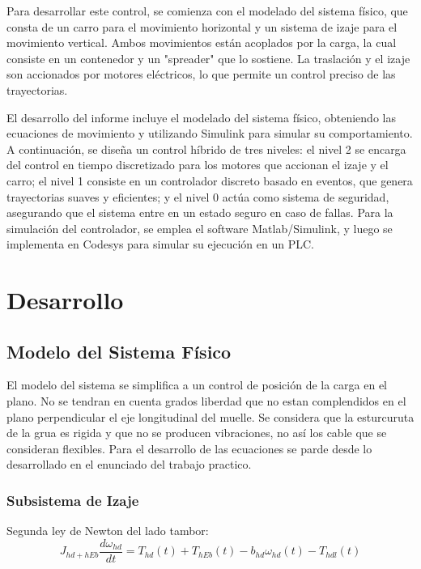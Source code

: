 \documentclass{article}
\begin{document}
Para desarrollar este control, se comienza con el modelado del sistema físico, que consta de un carro para el movimiento horizontal y un sistema de izaje para el movimiento vertical. Ambos movimientos están acoplados por la carga, la cual consiste en un contenedor y un "spreader" que lo sostiene. La traslación y el izaje son accionados por motores eléctricos, lo que permite un control preciso de las trayectorias.

El desarrollo del informe incluye el modelado del sistema físico, obteniendo las ecuaciones de movimiento y utilizando Simulink para simular su comportamiento. A continuación, se diseña un control híbrido de tres niveles: el nivel 2 se encarga del control en tiempo discretizado para los motores que accionan el izaje y el carro; el nivel 1 consiste en un controlador discreto basado en eventos, que genera trayectorias suaves y eficientes; y el nivel 0 actúa como sistema de seguridad, asegurando que el sistema entre en un estado seguro en caso de fallas. Para la simulación del controlador, se emplea el software Matlab/Simulink, y luego se implementa en Codesys para simular su ejecución en un PLC.


\section{Desarrollo} \label{sec:desarrollo}
    \subsection{Modelo del Sistema Físico} \label{sec:plantModel}

        El modelo del sistema se simplifica a un control de posición de la carga en el plano. No se tendran en cuenta grados liberdad que no estan complendidos en el plano perpendicular el eje longitudinal del muelle. Se considera que la esturcuruta de la grua es rigida y que no se producen vibraciones, no así los cable que se consideran flexibles.
        Para el desarrollo de las ecuaciones se parde desde lo desarrollado en el enunciado del trabajo practico.
        
        \subsubsection{Subsistema de Izaje}
            Segunda ley de Newton del lado tambor:
            \begin{equation} \label{eq:tamborIzaje}
                J_{hd+hEb} \frac{d \omega_{hd}}{dt} = T_{hd}(t) + T_{hEb}(t) - b_{hd} \omega_{hd}(t) - T_{hdl}(t)
            \end{equation}
\end{document}
